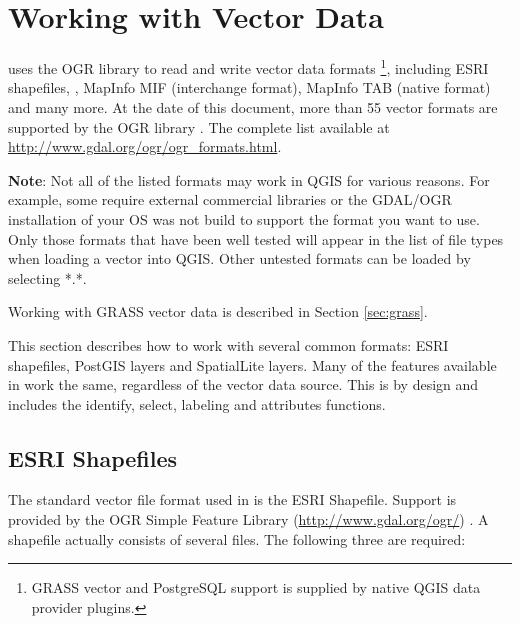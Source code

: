 
\chapter{Working with Vector Data}\label{label_workingvector}


\qg uses the OGR library to read and write vector data formats
\footnote{GRASS vector and PostgreSQL support is supplied by native 
QGIS data provider plugins.}, including ESRI shapefiles,
, MapInfo MIF (interchange 
format), MapInfo TAB 
(native format) and many more. 
At the date of this document, more than 55 vector formats are supported 
by the OGR library \cite{OGRweb}. The complete list available at 
\url{http://www.gdal.org/ogr/ogr_formats.html}.

\textbf{Note}: Not all of the listed formats may work in QGIS for various 
reasons. For example, some require external commercial libraries or 
the GDAL/OGR installation of your OS was not build to support the format you want
to use. Only those formats that have been well tested will appear in the list
of file types when loading a vector into QGIS. Other untested formats can 
be loaded by selecting *.*.

Working with GRASS vector data is described in Section \ref{sec:grass}.

This section describes how to work with several common formats:
ESRI shapefiles, PostGIS layers and SpatialLite layers. Many of the
features available in \qg work the same, regardless of the vector data source.
This is by design and includes the identify, select, labeling and attributes
functions.

\section{ESRI Shapefiles}

The standard vector file format used in \qg is the ESRI Shapefile. Support
is provided by the OGR Simple Feature Library (\url{http://www.gdal.org/ogr/})
. A shapefile actually consists of several files. The following three are required:

